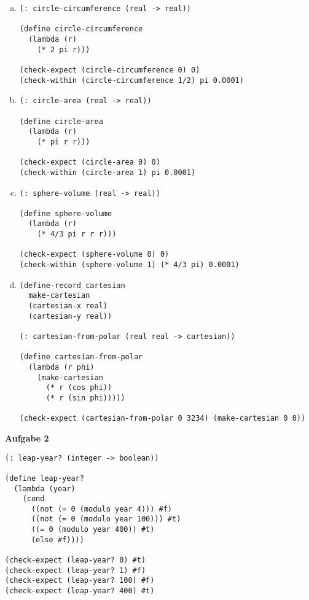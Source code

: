 \documentclass[a4paper,12pt]{article}
\newcommand{\Aufgabe}[1]{
  {
  \vspace*{0.5cm}
  \textsf{\textbf{Aufgabe #1}}
  \vspace*{0.2cm}

  }
}
\begin{document}
\begin{enumerate}[a)]
  \item \begin{verbatim}
(: circle-circumference (real -> real))

(define circle-circumference
  (lambda (r)
    (* 2 pi r)))

(check-expect (circle-circumference 0) 0)
(check-within (circle-circumference 1/2) pi 0.0001)
  \end{verbatim}
  \item \begin{verbatim}
(: circle-area (real -> real))

(define circle-area
  (lambda (r)
    (* pi r r)))

(check-expect (circle-area 0) 0)
(check-within (circle-area 1) pi 0.0001)
  \end{verbatim}
  \item \begin{verbatim}
(: sphere-volume (real -> real))

(define sphere-volume
  (lambda (r)
    (* 4/3 pi r r r)))

(check-expect (sphere-volume 0) 0)
(check-within (sphere-volume 1) (* 4/3 pi) 0.0001)
    \end{verbatim}
  \item \begin{verbatim}
(define-record cartesian
  make-cartesian
  (cartesian-x real)
  (cartesian-y real))

(: cartesian-from-polar (real real -> cartesian))

(define cartesian-from-polar
  (lambda (r phi)
    (make-cartesian
      (* r (cos phi))
      (* r (sin phi)))))

(check-expect (cartesian-from-polar 0 3234) (make-cartesian 0 0))
    \end{verbatim}
\end{enumerate}

\Aufgabe{2}
\begin{verbatim}
(: leap-year? (integer -> boolean))

(define leap-year?
  (lambda (year)
    (cond
      ((not (= 0 (modulo year 4))) #f)
      ((not (= 0 (modulo year 100))) #t)
      ((= 0 (modulo year 400)) #t)
      (else #f))))

(check-expect (leap-year? 0) #t)
(check-expect (leap-year? 1) #f)
(check-expect (leap-year? 100) #f)
(check-expect (leap-year? 400) #t)
\end{verbatim}
\end{document}
